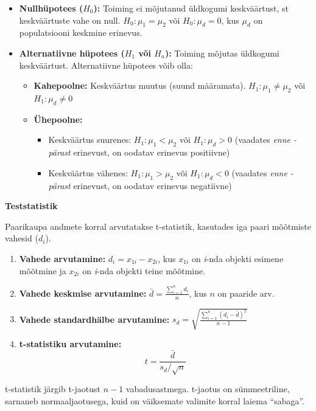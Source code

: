 \documentclass[
]{book}
\providecommand{\tightlist}{%
  \setlength{\itemsep}{0pt}\setlength{\parskip}{0pt}}
\begin{document}
\begin{itemize}
\item
  \textbf{Nullhüpotees (\(H_0\)):} Toiming ei mõjutanud üldkogumi keskväärtust, st keskväärtuste vahe on null.
  \(H_0: \mu_1 = \mu_2\) või \(H_0: \mu_d = 0\), kus \(\mu_d\) on populatsiooni keskmine erinevus.
\item
  \textbf{Alternatiivne hüpotees (\(H_1\) või \(H_a\)):} Toiming mõjutas üldkogumi keskväärtust. Alternatiivne hüpotees võib olla:

  \begin{itemize}
  \tightlist
  \item
    \textbf{Kahepoolne:} Keskväärtus muutus (suund määramata).
    \(H_1: \mu_1 \neq \mu_2\) või \(H_1: \mu_d \neq 0\)
  \item
    \textbf{Ühepoolne:}

    \begin{itemize}
    \tightlist
    \item
      Keskväärtus suurenes: \(H_1: \mu_1 < \mu_2\) või \(H_1: \mu_d > 0\) (vaadates \emph{enne - pärast} erinevust, on oodatav erinevus positiivne)
    \item
      Keskväärtus vähenes: \(H_1: \mu_1 > \mu_2\) või \(H_1: \mu_d < 0\) (vaadates \emph{enne - pärast} erinevust, on oodatav erinevus negatiivne)
    \end{itemize}
  \end{itemize}
\end{itemize}

\textbf{Teststatistik}

Paarikaupa andmete korral arvutatakse t-statistik, kasutades iga paari mõõtmiste vahesid (\(d_i\)).

\begin{enumerate}
\def\labelenumi{\arabic{enumi}.}
\item
  \textbf{Vahede arvutamine:} \(d_i = x_{1i} - x_{2i}\), kus \(x_{1i}\) on \emph{i}-nda objekti esimene mõõtmine ja \(x_{2i}\) on \emph{i}-nda objekti teine mõõtmine.
\item
  \textbf{Vahede keskmise arvutamine:} \(\bar{d} = \frac{\sum_{i=1}^{n} d_i}{n}\), kus \(n\) on paaride arv.
\item
  \textbf{Vahede standardhälbe arvutamine:} \(s_d = \sqrt{\frac{\sum_{i=1}^{n} (d_i - \bar{d})^2}{n-1}}\)
\item
  \textbf{t-statistiku arvutamine:}
  \[t = \frac{\bar{d}}{s_d / \sqrt{n}}\]
\end{enumerate}

t-statistik järgib t-jaotust \(n-1\) vabadusastmega. t-jaotus on sümmeetriline, sarnaneb normaaljaotusega, kuid on väiksemate valimite korral laiema ``sabaga''.
\end{document}
